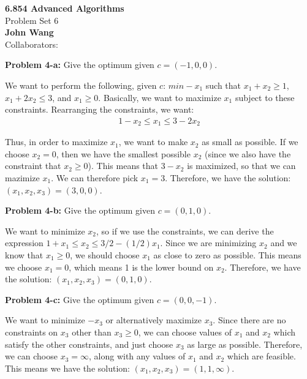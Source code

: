 \documentclass[psamsfonts]{amsart}
\newenvironment{sol}{\vspace{0.25cm}{\large \bfseries Solution:}}{\qedsymbol}
\newenvironment{prob}[1]{\begin{framed}{\large \bfseries Problem #1:}}{\end{framed}}
\newcommand{\makenewtitle}{
    \begin{center}
    {\huge \bfseries 6.854 Advanced Algorithms} \\
    Problem Set 6\\
    \vspace{0.25cm}
    {\bfseries John Wang} \\
    Collaborators: 
    \end{center}
    \vspace{0.5cm}
}
\begin{document}
\newpage
\makenewtitle

\begin{prob}{4-a}
Give the optimum given $c = (-1, 0, 0)$. 
\end{prob}

\begin{sol}
We want to perform the following, given $c$: $min -x_1$ such that $x_1 + x_2 \geq 1$, $x_1 + 2 x_2 \leq 3$, and $x_1 \geq 0$. Basically, we want to maximize $x_1$ subject to these constraints. Rearranging the constraints, we want:
\begin{eqnarray}
1 - x_2 \leq x_1 \leq 3 - 2 x_2
\end{eqnarray}

Thus, in order to maximize $x_1$, we want to make $x_2$ as small as possible. If we choose $x_2 = 0$, then we have the smallest possible $x_2$ (since we also have the constraint that $x_2 \geq 0$). This means that $3 - x_2$ is maximized, so that we can mazimize $x_1$. We can therefore pick $x_1 = 3$. Therefore, we have the solution: $(x_1, x_2, x_3) = (3, 0, 0)$. 
\end{sol}

\begin{prob}{4-b}
Give the optimum given $c = (0, 1, 0)$. 
\end{prob}

\begin{sol}
We want to minimize $x_2$, so if we use the constraints, we can derive the expression $1 + x_1 \leq x_2 \leq 3/2 - (1/2) x_1$. Since we are minimizing $x_2$ and we know that $x_1 \geq 0$, we should choose $x_1$ as close to zero as possible. This means we choose $x_1 = 0$, which means 1 is the lower bound on $x_2$. Therefore, we have the solution: $(x_1, x_2, x_3) = (0, 1, 0)$. 
\end{sol}

\begin{prob}{4-c}
Give the optimum given $c = (0, 0, -1)$.
\end{prob}

\begin{sol}
We want to minimize $-x_3$ or alternatively maximize $x_3$. Since there are no constraints on $x_3$ other than $x_3 \geq 0$, we can choose values of $x_1$ and $x_2$ which satisfy the other constraints, and just choose $x_3$ as large as possible. Therefore, we can choose $x_3 = \infty$, along with any values of $x_1$ and $x_2$ which are feasible. This means we have the solution: $(x_1, x_2, x_3) = (1, 1, \infty)$. 
\end{sol}
\end{document}
